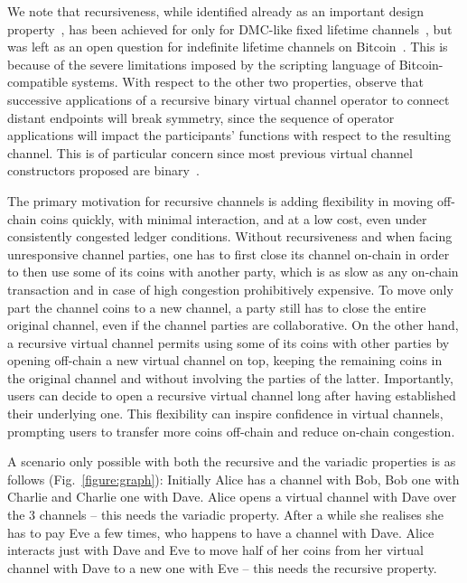 We note that recursiveness, while identified already as an important design
property~\cite{DBLP:conf/ccs/DziembowskiFH18}, has been achieved for only for
DMC-like fixed lifetime channels~\cite{10.1007/978-3-030-65411-5_18}, but was
left as an open question for indefinite lifetime
channels on Bitcoin~\cite{9519487}.
This is because of the severe limitations imposed by the scripting language of Bitcoin-compatible systems.
With respect to the other two properties, observe that successive applications
of a recursive binary virtual channel operator to connect distant endpoints will
break symmetry, since the sequence of operator applications will impact the
participants' functions with respect to the resulting channel. This is of
particular concern since most previous virtual channel constructors proposed are
binary~\cite{DBLP:conf/ccs/DziembowskiFH18,9519487,10.1007/978-3-030-65411-5_18}.

The primary motivation for recursive channels is adding flexibility in
moving off-chain coins quickly, with minimal interaction, and at a low cost, even
under consistently
congested ledger conditions. Without recursiveness and when facing
unresponsive channel parties, one has to first
close its channel on-chain in order to then use some of its coins with
another party, which is as slow as any on-chain transaction and in case of high
congestion prohibitively expensive. To move only part the channel coins to a
new channel, a party still has to close the
entire original channel, even if the channel parties are collaborative.
On the other hand, a recursive
virtual channel permits using some of its coins with other parties by
opening off-chain a new virtual channel on top, keeping the remaining coins in
the original channel and without involving the parties of
the latter. Importantly, users can decide to open a recursive virtual channel
long after having established their underlying one. This flexibility can inspire confidence in virtual
channels, prompting users to transfer more coins off-chain and
reduce on-chain congestion.

A scenario only possible with both the recursive and the variadic
properties is as follows (Fig.~\ref{figure:graph}): Initially Alice has a channel with
Bob, Bob one with Charlie and Charlie one with Dave. Alice opens a virtual
channel with Dave over the $3$ channels -- this needs the variadic property.
After a while she realises she has to pay Eve a few
times, who happens to have a channel with Dave. Alice interacts just with
Dave and Eve to move half of her coins from her virtual channel with Dave to a
new one with Eve -- this needs the recursive property.

